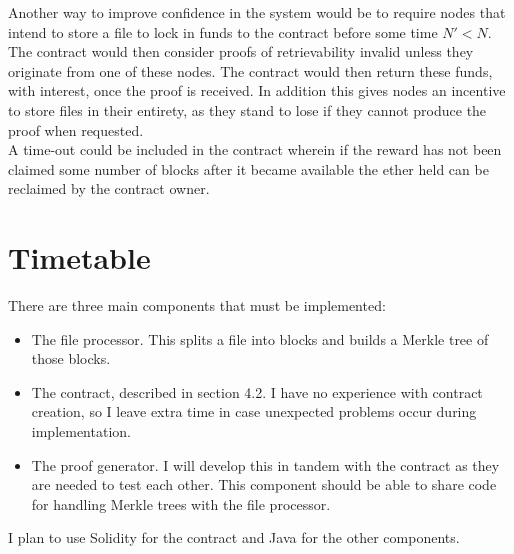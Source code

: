\documentclass[oneside]{article}
\begin{document}
Another way to improve confidence in the system would be to require nodes that intend to store a file to lock in funds to the contract before some time $N' < N$.
The contract would then consider proofs of retrievability invalid unless they originate from one of these nodes.
The contract would then return these funds, with interest, once the proof is received.
In addition this gives nodes an incentive to store files in their entirety, as they stand to lose if they cannot produce the proof when requested.\\

A time-out could be included in the contract wherein if the reward has not been claimed some number of blocks after it became available the ether held can be reclaimed by the contract owner.
\section{Timetable}

There are three main components that must be implemented:
\begin{itemize}
\item The file processor. This splits a file into blocks and builds a Merkle tree of those blocks.
\item The contract, described in section 4.2. I have no experience with contract creation, so I leave extra time in case unexpected problems occur during implementation.
\item The proof generator. I will develop this in tandem with the contract as they are needed to test each other.
This component should be able to share code for handling Merkle trees with the file processor.
\end{itemize}

I plan to use Solidity for the contract and Java for the other components.
\end{document}
